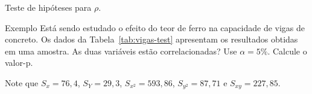 \documentclass[9pt]{beamer}
\begin{document}
\begin{frame}{Teste de hipóteses para $\rho$.}
\begin{block}{Exemplo}
	Está sendo estudado o efeito do teor de ferro na capacidade de vigas de concreto. Os dados da Tabela~\ref{tab:vigas-test} apresentam os resultados obtidas em uma amostra. As duas variáveis estão correlacionadas? Use $\alpha=5\%$. Calcule o valor-p.
	\begin{table}[ht]
		\centering
		\caption{Amostra com 10 vigas.} 
		\label{tab:vigas-test}
	\end{table}
	Note que $S_{x}= 76,4$, $S_{Y}=29,3$, $S_{x^2}=593,86$, $S_{y^2}=87,71$ e $S_{xy} = 227,85$.
\end{block}
\end{frame}
\end{document}
